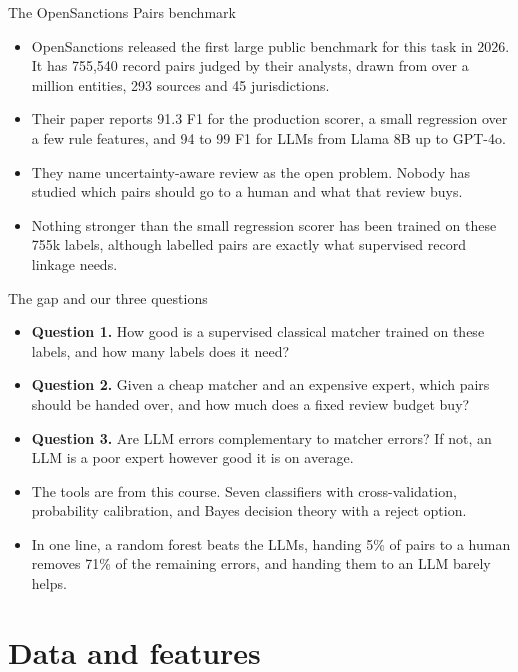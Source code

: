 \documentclass[aspectratio=169,10pt]{beamer}
\newcommand{\hi}[1]{\textcolor{accent2}{\textbf{#1}}}
\begin{document}
\begin{frame}{The OpenSanctions Pairs benchmark}
\begin{itemize}
\item OpenSanctions released the first large public benchmark for this task in 2026. It has 755{,}540 record pairs judged by their analysts, drawn from over a million entities, 293 sources and 45 jurisdictions.
\item Their paper reports 91.3 F1 for the production scorer, a small regression over a few rule features, and 94 to 99 F1 for LLMs from Llama 8B up to GPT-4o.
\item They name uncertainty-aware review as the open problem. Nobody has studied which pairs should go to a human and what that review buys.
\item Nothing stronger than the small regression scorer has been trained on these 755k labels, although labelled pairs are exactly what supervised record linkage needs.
\end{itemize}
\end{frame}

\begin{frame}{The gap and our three questions}
\begin{itemize}
\item \hi{Question 1.} How good is a supervised classical matcher trained on these labels, and how many labels does it need?
\item \hi{Question 2.} Given a cheap matcher and an expensive expert, which pairs should be handed over, and how much does a fixed review budget buy?
\item \hi{Question 3.} Are LLM errors complementary to matcher errors? If not, an LLM is a poor expert however good it is on average.
\item The tools are from this course. Seven classifiers with cross-validation, probability calibration, and Bayes decision theory with a reject option.
\item In one line, a random forest beats the LLMs, handing 5\% of pairs to a human removes 71\% of the remaining errors, and handing them to an LLM barely helps.
\end{itemize}
\end{frame}

\section{Data and features}
\end{document}
